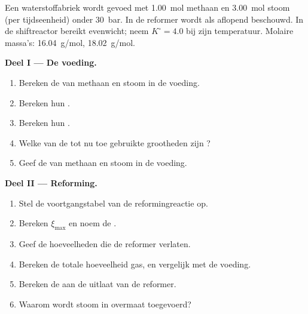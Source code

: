 \begin{problem}
\label{pb:b1:extent-q-and-k:1}
Een waterstoffabriek wordt gevoed met \qty{1.00}{mol} methaan en
\qty{3.00}{mol} stoom (per tijdseenheid) onder \qty{30}{bar}. In de
reformer wordt  als aflopend beschouwd. In de
shiftreactor bereikt  evenwicht; neem
$K^\circ =
4.0$ bij zijn temperatuur. Molaire massa's:  \qty{16.04}{g/mol},
 \qty{18.02}{g/mol}.

\medskip
\noindent\textbf{Deel I --- De voeding.}
\begin{enumerate}
  \item Bereken de  van methaan en stoom in de voeding.
  \item Bereken hun .
  \item Bereken hun .
  \item Welke van de tot nu toe gebruikte grootheden zijn ?
  \item Geef de  van methaan en stoom in de voeding.
\end{enumerate}

\medskip
\noindent\textbf{Deel II --- Reforming.}
\begin{enumerate}[resume]
  \item Stel de voortgangstabel van de reformingreactie op.
  \item Bereken $\xi_{\max}$ en noem de .
  \item Geef de hoeveelheden die de reformer verlaten.
  \item Bereken de totale hoeveelheid gas, en vergelijk met de voeding.
  \item Bereken de  aan de uitlaat van de reformer.
  \item Waarom wordt stoom in overmaat toegevoerd?
\end{enumerate}


\end{problem}
